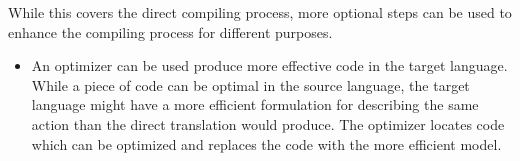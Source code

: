 While this covers the direct compiling process, more optional steps can be used to enhance the compiling process for different purposes.\\

\begin{itemize}
\item An optimizer can be used produce more effective code in the target language. While a piece of code can be optimal in the source language, the target language might have a more efficient formulation for describing the same action than the direct translation would produce. The optimizer locates code which can be optimized and replaces the code with the more efficient model.

\end{itemize}
